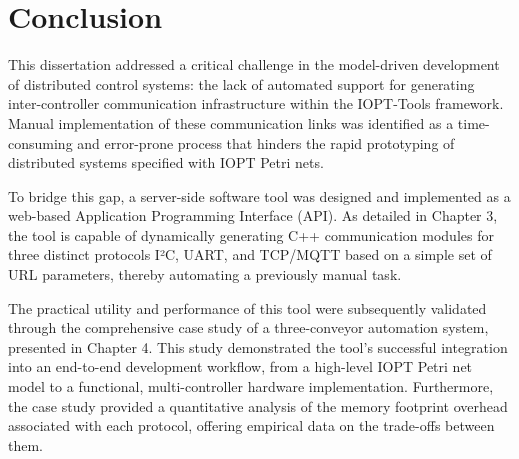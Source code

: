 
%

\chapter{Conclusion}
\label{cha:conclusion}

This dissertation addressed a critical challenge in the model-driven development of distributed control systems: the lack of automated support for generating inter-controller communication infrastructure within the IOPT-Tools framework. Manual implementation of these communication links was identified as a time-consuming and error-prone process that hinders the rapid prototyping of distributed systems specified with IOPT Petri nets.

To bridge this gap, a server-side software tool was designed and implemented as a web-based Application Programming Interface (API). As detailed in Chapter 3, the tool is capable of dynamically generating C++ communication modules for three distinct protocols I²C, UART, and TCP/MQTT                                                                                                                                                                                                                                                                                                                                                                                                                                                                                                                                                      based on a simple set of URL parameters, thereby automating a previously manual task.

The practical utility and performance of this tool were subsequently validated through the comprehensive case study of a three-conveyor automation system, presented in Chapter 4. This study demonstrated the tool's successful integration into an end-to-end development workflow, from a high-level IOPT Petri net model to a functional, multi-controller hardware implementation. Furthermore, the case study provided a quantitative analysis of the memory footprint overhead associated with each protocol, offering empirical data on the trade-offs between them.


